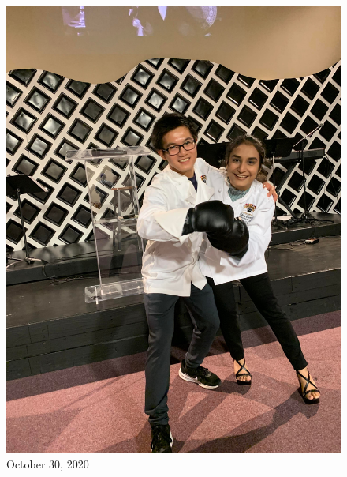 \documentclass[
]{book}
\begin{document}
\begin{figure}
\centering
\includegraphics[width=5.20833in,height=\textheight]{mimages/4 10-30-2020.jpg}
\caption{October 30, 2020}
\end{figure}
\end{document}
